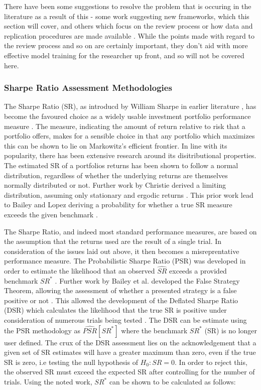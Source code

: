 \documentclass[a4paper,11pt,oneside]{article}
\theoremstyle{plain}
\theoremstyle{definition}
\begin{document}
	There have been some suggestions to resolve the problem that is occuring in the literature as a result of this - some 
	work suggesting new frameworks, which this section will cover, and others which focus on the review process or 
	how data and replication procedures are made available \cite{Prado}. While the points made with regard to the review process 
	and so on are certainly important, they don't aid with more effective model training for the researcher up front, and 
	so will not be covered here.
	
	\subsubsection{Sharpe Ratio Assessment Methodologies}\label{lr_backtest_sr}
	
	
	The Sharpe Ratio (SR), as introducd by William Sharpe in earlier literature \cite{Sharpe}, has become the favoured choice as a widely usable
	investment portfolio performance measure \cite{BaileyFrontier}. The measure, indicating the amount of return relative to risk that a portfolio offers, makes for 
	a sensible choice in that any portfolio which maximizes this can be shown to lie on Markowitz's efficient frontier. In line with its popularity, there has been 
	extensive research around its disitributional properties. The estimated SR of a portfolios returns has been shown to follow a normal distribution, regardless
	of whether the underlying returns are themselves normally distributed or not. Further work by Christie derived a limiting distribution, assuming only stationary and ergodic returns \cite{Christie, Opdyke}. This prior work lead to Bailey and Lopez deriving a probability for whether a true SR measure exceeds the given benchmark \cite{BaileyFrontier}.
	\hfill \break 
	
	The Sharpe Ratio, and indeed most standard performance measures, are based on the assumption that the returns used are the result of a single trial. In consideration of the issues laid out above, it then becomes a misreprentative performance measure. The Probabilistic Sharpe Ratio (PSR) was developed in order to estimate the likelihood that an observed $\widehat{SR}$ exceeds a provided benchmark $SR^{*}$ \cite{BaileyFrontier}. Further work by Bailey et al. developed the False Strategy Theorem, allowing the assessment of whether a presented strategy is a false positive or not \cite{BaileySharpe}. This allowed the development of the Deflated Sharpe Ratio (DSR) which calculates the likelihood that the true SR is positive under consideration of numerous trials being tested \cite{BaileySharpe}. The DSR can be estimate using the PSR methodology as $\widehat{PSR}[SR^*]$ where the benchmark $SR^{*}$ (SR) is no longer user defined. The crux of the DSR assessment lies on the acknowledgement that a given set of SR estimates will have a greater maximum than zero, even if the true SR is zero, i.e testing the null hypothesis of $H_0:SR=0$. In order to reject this, the observed SR must exceed the expected SR after controlling for the number of trials. Using the noted work, $SR^*$ can be shown to be calculated as follows: 
	\hfill \break 
	
\end{document}
